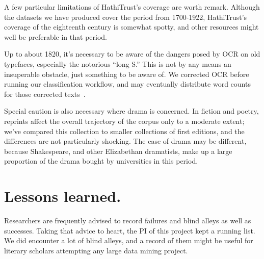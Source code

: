 \documentclass[paper=a4, fontsize=12pt]{scrartcl}
\numberwithin{equation}{section}		%
\numberwithin{figure}{section}			%
\numberwithin{table}{section}				%
\begin{document}
A few particular limitations of HathiTrust's coverage are worth remark. Although the datasets we have produced cover the period from 1700-1922, HathiTrust's coverage of the eighteenth century is somewhat spotty, and other resources might well be preferable in that period.

Up to about 1820, it's necessary to be aware of the dangers posed by OCR on old typefaces, especially the notorious ``long S.'' This is not by any means an insuperable obstacle, just something to be aware of. We corrected OCR before running our classification workflow, and may eventually distribute word counts for those corrected texts~\cite{underwood:decent}.

Special caution is also necessary where drama is concerned. In fiction and poetry, reprints affect the overall trajectory of the corpus only to a moderate extent; we've compared this collection to smaller collections of first editions, and the differences are not particularly shocking. The case of drama may be different, because Shakespeare, and other Elizabethan dramatists, make up a large proportion of the drama bought by universities in this period.

\section{Lessons learned.}
\label{sec:lessons}

Researchers are frequently advised to record failures and blind alleys as well as successes. Taking that advice to heart, the PI of this project kept a running list. We did encounter a lot of blind alleys, and a record of them might be useful for literary scholars attempting any large data mining project.
\end{document}
